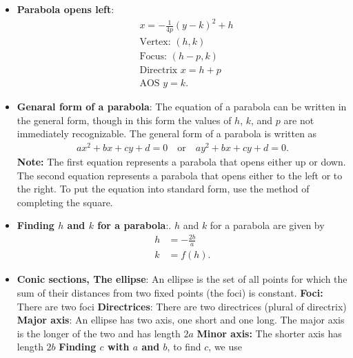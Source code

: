 \documentclass{report}
\begin{document}
\begin{itemize}
    \item \textbf{Parabola opens left}:
        \begin{align*}
            &x= -\frac{1}{4p}(y-k)^{2} + h \\
            &\text{Vertex: } (h,k) \\
            &\text{Focus: } (h-p,k) \\
            &\text{Directrix } x=h+p \\
            &\text{AOS } y=k
        .\end{align*}
        \bigbreak \noindent 
    \item \textbf{Genaral form of a parabola}:
        The equation of a parabola can be written in the general form, though in this form the values of $h$, $k$, and $p$ are not immediately recognizable. The general form of a parabola is written as
        \begin{align*}
             ax^2 + bx + cy + d = 0 \quad \text{or} \quad ay^2 + bx + cy + d = 0
        .\end{align*}
        \textbf{Note:} The first equation represents a parabola that opens either up or down. The second equation represents a parabola that opens either to the left or to the right. To put the equation into standard form, use the method of completing the square.
    \item \textbf{Finding $h$ and $k$ for a parabola}:. $h$ and $k$ for a parabola are given by
        \begin{align*}
            h &= -\frac{2b}{a} \\
            k &= f(h)
        .\end{align*}
    \item \textbf{Conic sections, The ellipse}:
        An ellipse is the set of all points for which the sum of their distances from two fixed points (the foci) is constant.
        \bigbreak \noindent 
        \bigbreak \noindent 
        \textbf{Foci:} There are two foci
        \smallbreak \noindent
        \textbf{Directrices}: There are two directrices (plural of directrix)
        \smallbreak \noindent
        \textbf{Major axis}: An ellipse has two axis, one short and one long. The major axis is the longer of the two and has length $2a$
        \smallbreak \noindent
        \textbf{Minor axis:} The shorter axis has length $2b$
        \smallbreak \noindent
        \textbf{Finding $c$ with $a$ and $b$}, to find $c$, we use
        \begin{align*}

\end{align*}
\end{itemize}
\end{document}
